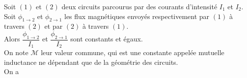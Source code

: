 \documentclass[a4paper]{article}
\begin{document}
\pagestyle{fancy}
\fancyhf{}
\setlength{\headheight}{15pt}

\begin{center}
	\large{}
\end{center}


Soit \((1)\) et \((2)\) deux circuits parcourus par des courants d'intensité \(I_1\) et \(I_2\).\\
Soit \(\phi_{1\rightarrow2}\) et \(\phi_{2\rightarrow1}\) les flux magnétiques envoyés respectivement par \((1)\) à travers \((2)\) et par \((2)\) à travers \((1)\).\\
Alors \(\dfrac{\phi_{1\rightarrow2}}{I_1}\) et \(\dfrac{\phi_{2\rightarrow1}}{I_2}\) sont constants et égaux.\\
On note \(\mathcal{M}\) leur valeur commune, qui est une constante appelée mutuelle inductance ne dépendant que de la géométrie des circuits.\\
On a 
\end{document}
